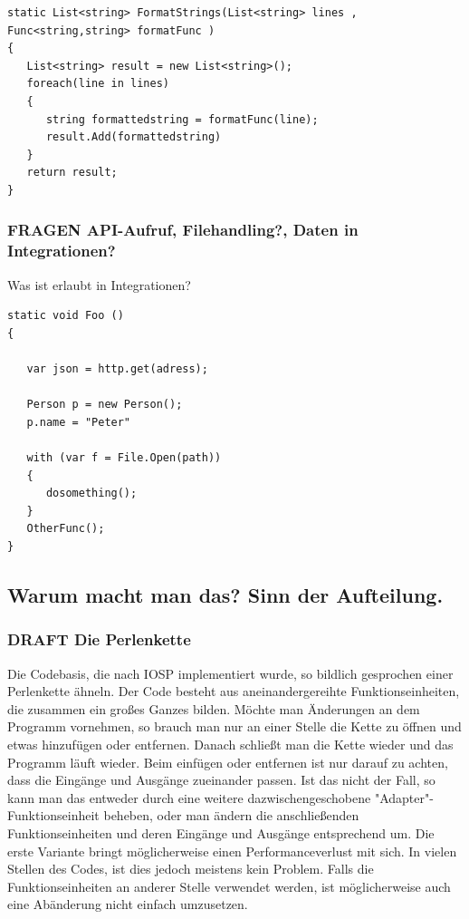 \documentclass[11pt]{article}
\begin{document}
\begin{verbatim}
static List<string> FormatStrings(List<string> lines , Func<string,string> formatFunc )
{
   List<string> result = new List<string>();
   foreach(line in lines)
   {
      string formattedstring = formatFunc(line);
      result.Add(formattedstring) 
   }
   return result;
}
\end{verbatim}


\subsubsection{{\bfseries\sffamily FRAGEN} API-Aufruf, Filehandling?, Daten in Integrationen?}
\label{sec:orgheadline60}

Was ist erlaubt in Integrationen? 

\begin{verbatim}
static void Foo ()
{

   var json = http.get(adress);

   Person p = new Person();
   p.name = "Peter"

   with (var f = File.Open(path))
   {
      dosomething();
   }
   OtherFunc();
}
\end{verbatim}

\subsection{Warum macht man das? Sinn der Aufteilung.}
\label{sec:orgheadline65}
\subsubsection{{\bfseries\sffamily DRAFT} Die Perlenkette}
\label{sec:orgheadline62}
Die Codebasis, die nach IOSP implementiert wurde, so bildlich gesprochen einer
Perlenkette ähneln. Der Code besteht aus aneinandergereihte Funktionseinheiten,
die zusammen ein großes Ganzes bilden. Möchte man Änderungen an dem Programm
vornehmen, so brauch man nur an einer Stelle die Kette zu öffnen und etwas
hinzufügen oder entfernen. Danach schließt man die Kette wieder und das Programm
läuft wieder. Beim einfügen oder entfernen ist nur darauf zu achten, dass die
Eingänge und Ausgänge zueinander passen. Ist das nicht der Fall, so kann man das
entweder durch eine weitere dazwischengeschobene "Adapter"-Funktionseinheit
beheben, oder man ändern die anschließenden Funktionseinheiten und deren
Eingänge und Ausgänge entsprechend um. 
Die erste Variante bringt möglicherweise einen Performanceverlust mit sich.
In vielen Stellen des Codes, ist dies jedoch meistens kein Problem.
Falls die Funktionseinheiten an anderer Stelle verwendet werden, ist
möglicherweise auch eine Abänderung nicht einfach umzusetzen.
\end{document}
